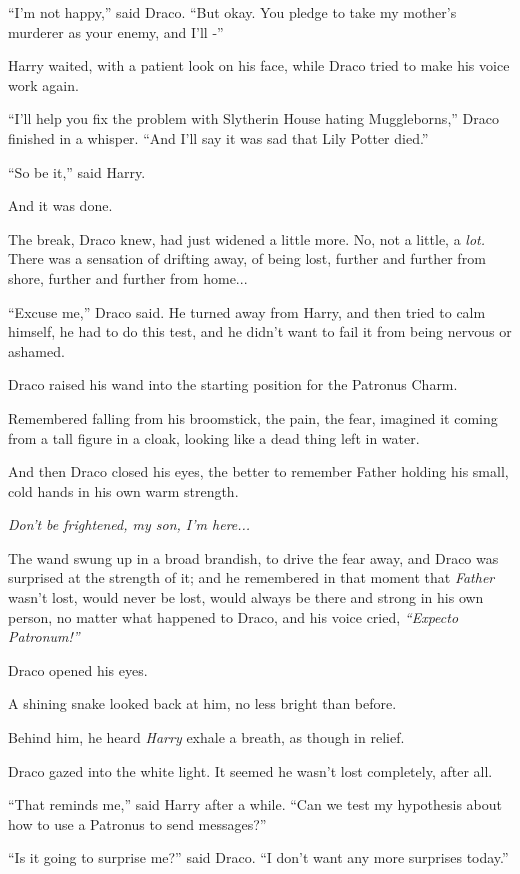 ``I'm not happy,'' said Draco. ``But okay. You pledge to take my
mother's murderer as your enemy, and I'll -''

Harry waited, with a patient look on his face, while Draco tried to make
his voice work again.

``I'll help you fix the problem with Slytherin House hating
Muggleborns,'' Draco finished in a whisper. ``And I'll say it was sad
that Lily Potter died.''

``So be it,'' said Harry.

And it was done.

The break, Draco knew, had just widened a little more. No, not a little,
a \emph{lot.} There was a sensation of drifting away, of being lost,
further and further from shore, further and further from home...

``Excuse me,'' Draco said. He turned away from Harry, and then tried to
calm himself, he had to do this test, and he didn't want to fail it from
being nervous or ashamed.

Draco raised his wand into the starting position for the Patronus Charm.

Remembered falling from his broomstick, the pain, the fear, imagined it
coming from a tall figure in a cloak, looking like a dead thing left in
water.

And then Draco closed his eyes, the better to remember Father holding
his small, cold hands in his own warm strength.

\emph{Don't be frightened, my son, I'm here...}

The wand swung up in a broad brandish, to drive the fear away, and Draco
was surprised at the strength of it; and he remembered in that moment
that \emph{Father} wasn't lost, would never be lost, would always be
there and strong in his own person, no matter what happened to Draco,
and his voice cried, \emph{``Expecto Patronum!''}

Draco opened his eyes.

A shining snake looked back at him, no less bright than before.

Behind him, he heard \emph{Harry} exhale a breath, as though in relief.

Draco gazed into the white light. It seemed he wasn't lost completely,
after all.

``That reminds me,'' said Harry after a while. ``Can we test my
hypothesis about how to use a Patronus to send messages?''

``Is it going to surprise me?'' said Draco. ``I don't want any more
surprises today.''

